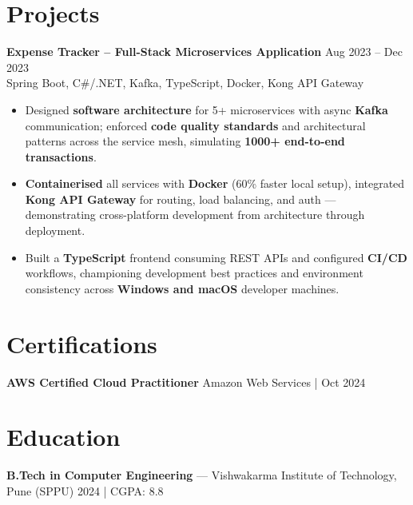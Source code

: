 \documentclass[10pt,letterpaper]{article}
\newcommand{\resumeSubheading}[4]{%
  \textbf{#1} \hfill #2 \\
  #3 \hfill #4 \\
}
\begin{document}
\section*{Projects}

\resumeSubheading{Expense Tracker -- Full-Stack Microservices Application}{Aug 2023 -- Dec 2023}{}{Spring Boot, C\#/.NET, Kafka, TypeScript, Docker, Kong API Gateway}
\begin{itemize}
    \item Designed \textbf{software architecture} for 5+ microservices with async \textbf{Kafka} communication; enforced \textbf{code quality standards} and architectural patterns across the service mesh, simulating \textbf{1000+ end-to-end transactions}.
    \item \textbf{Containerised} all services with \textbf{Docker} (60\% faster local setup), integrated \textbf{Kong API Gateway} for routing, load balancing, and auth --- demonstrating cross-platform development from architecture through deployment.
    \item Built a \textbf{TypeScript} frontend consuming REST APIs and configured \textbf{CI/CD} workflows, championing development best practices and environment consistency across \textbf{Windows and macOS} developer machines.
\end{itemize}

\section*{Certifications}
\textbf{AWS Certified Cloud Practitioner} \hfill Amazon Web Services \;|\; Oct 2024

\section*{Education}
\textbf{B.Tech in Computer Engineering} --- Vishwakarma Institute of Technology, Pune (SPPU) \hfill 2024 \;|\; CGPA: 8.8
\end{document}
